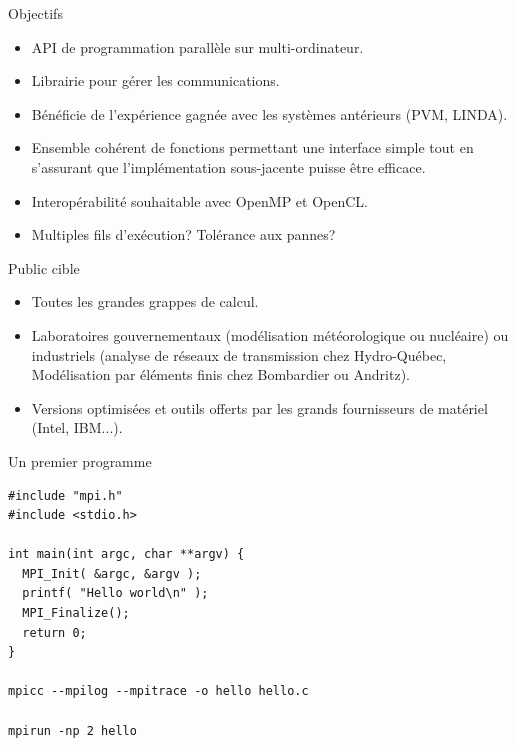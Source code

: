 \documentclass[10pt]{beamer}
\begin{document}
\begin{frame}{Objectifs}

  \begin{itemize}
    \item API de programmation parallèle sur multi-ordinateur.

    \item Librairie pour gérer les communications.

    \item Bénéficie de l'expérience gagnée avec les systèmes antérieurs (PVM, LINDA).

    \item Ensemble cohérent de fonctions permettant une interface simple tout en s'assurant que l'implémentation sous-jacente puisse être efficace.

    \item Interopérabilité souhaitable avec OpenMP et OpenCL.

    \item Multiples fils d'exécution? Tolérance aux pannes?
  \end{itemize}
\end{frame}

\begin{frame}{Public cible}

  \begin{itemize}
    \item Toutes les grandes grappes de calcul.

    \item Laboratoires gouvernementaux (modélisation météorologique ou nucléaire) ou industriels (analyse de réseaux de transmission chez Hydro-Québec, Modélisation par éléments finis chez Bombardier ou Andritz).

    \item Versions optimisées et outils offerts par les grands fournisseurs de matériel (Intel, IBM...).
  \end{itemize}
\end{frame}

\begin{frame}[fragile]{Un premier programme}

  \begin{verbatim}
#include "mpi.h"
#include <stdio.h>

int main(int argc, char **argv) {
  MPI_Init( &argc, &argv );
  printf( "Hello world\n" );
  MPI_Finalize();
  return 0;
}

mpicc --mpilog --mpitrace -o hello hello.c

mpirun -np 2 hello
  \end{verbatim}
\end{frame}
\end{document}
